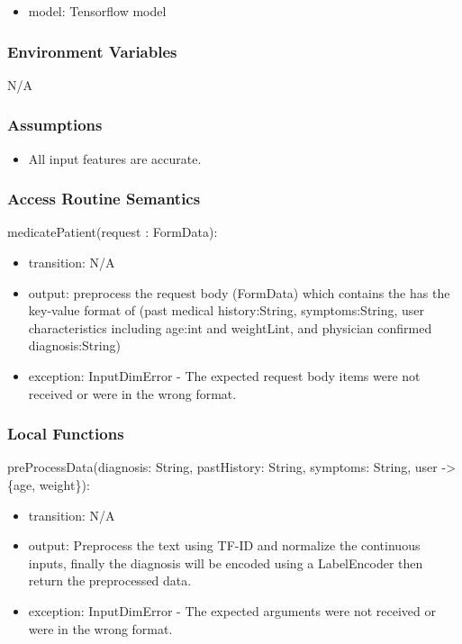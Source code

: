 \documentclass[12pt, titlepage]{article}
\begin{document}
\begin{itemize}
  \item model: Tensorflow model
\end{itemize}

\subsubsection{Environment Variables}

N/A

\subsubsection{Assumptions}


\begin{itemize}
  \item All input features are accurate.
\end{itemize}

\subsubsection{Access Routine Semantics}

\noindent medicatePatient(request : FormData):
\begin{itemize}
\item transition: N/A
\item output: preprocess the request body (FormData) which contains the has the key-value format of (past medical history:String, symptoms:String, user characteristics including age:int and weightLint, and physician confirmed diagnosis:String)
\item exception: InputDimError - The expected request body items were not received or were in the wrong format.
\end{itemize}

\subsubsection{Local Functions}

\noindent preProcessData(diagnosis: String, pastHistory: String, symptoms: String, user -> \{age, weight\}):
\begin{itemize}
\item transition: N/A
\item output: Preprocess the text using TF-ID and normalize the continuous inputs, finally the diagnosis will be encoded using a LabelEncoder then return the preprocessed data.
\item exception: InputDimError - The expected arguments were not received or were in the wrong format.
\end{itemize}
\end{document}

